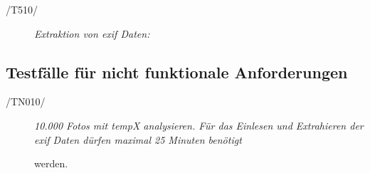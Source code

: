 		\begin{description}

			\item[/T510/] \textit{Extraktion von \gls{exif} Daten:}\par 

		\end{description}
		
\subsection{Testfälle für nicht funktionale Anforderungen}
	
	\begin{description}
		
			\item[/TN010/]\textit{10.000 Fotos mit \gls{tempX} analysieren. Für das Einlesen und Extrahieren der \gls{exif} Daten dürfen maximal 25 Minuten benötigt}\par werden.
	
	\end{description}
 